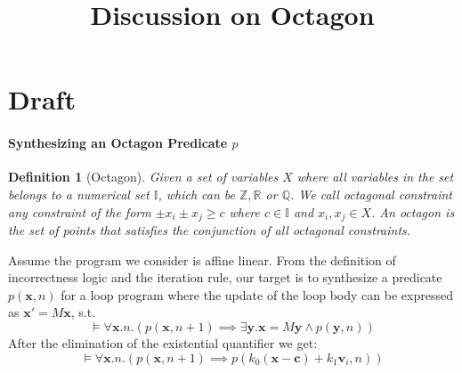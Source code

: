 \documentclass[a4paper,12pt]{article}
\title{Discussion on Octagon}
\newtheorem{definition}{Definition}
\begin{document}
\maketitle

\section{Draft}
\paragraph{Synthesizing an Octagon Predicate $p$}

\begin{definition}[Octagon]
Given a set of variables $X$ where all variables in the set belongs to a numerical set $\mathbb{I}$, which can be $\mathbb{Z}, \mathbb{R}$ or $\mathbb{Q}$. We call \emph{octagonal constraint} any constraint of the form $\pm x_i \pm x_j \ge c$ where $c\in\mathbb{I}$ and $x_i,x_j\in X$. An \emph{octagon} is the set of points that satisfies the conjunction of all octagonal constraints. 


\end{definition}
Assume the program we consider is affine linear. From the definition of incorrectness logic and the iteration rule, our target is to synthesize a predicate $p(\mathbf{x},n)$ for a loop program where the update of the loop body can be expressed as $\mathbf{x}' = M\mathbf{x}$, s.t. 
\[\models \forall \mathbf{x}.n. (p(\mathbf{x},n+1) \implies \exists \mathbf{y}.\mathbf{x} = M\mathbf{y} \wedge p(\mathbf{y}, n))\]
After the elimination of the existential quantifier we get:
\[\models \forall \mathbf{x}.n. (p(\mathbf{x}, n+1) \implies p(k_0(\mathbf{x} - \mathbf{c}) + k_1\mathbf{v}_i, n))\]
\end{document}
